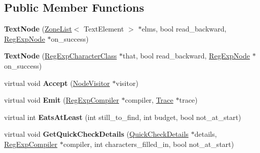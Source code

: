 \subsection*{Public Member Functions}
\begin{DoxyCompactItemize}
\item 
{\bfseries Text\+Node} (\hyperlink{classv8_1_1internal_1_1_zone_list}{Zone\+List}$<$ Text\+Element $>$ $\ast$elms, bool read\+\_\+backward, \hyperlink{classv8_1_1internal_1_1_reg_exp_node}{Reg\+Exp\+Node} $\ast$on\+\_\+success)\hypertarget{classv8_1_1internal_1_1_text_node_ad82f037bc18bc07fe99b03473cca0713}{}\label{classv8_1_1internal_1_1_text_node_ad82f037bc18bc07fe99b03473cca0713}

\item 
{\bfseries Text\+Node} (\hyperlink{classv8_1_1internal_1_1_reg_exp_character_class}{Reg\+Exp\+Character\+Class} $\ast$that, bool read\+\_\+backward, \hyperlink{classv8_1_1internal_1_1_reg_exp_node}{Reg\+Exp\+Node} $\ast$on\+\_\+success)\hypertarget{classv8_1_1internal_1_1_text_node_a37623d87d91c4df2206bd2e39705caf0}{}\label{classv8_1_1internal_1_1_text_node_a37623d87d91c4df2206bd2e39705caf0}

\item 
virtual void {\bfseries Accept} (\hyperlink{classv8_1_1internal_1_1_node_visitor}{Node\+Visitor} $\ast$visitor)\hypertarget{classv8_1_1internal_1_1_text_node_afc1b418856860bb73f833a3dd4655ff9}{}\label{classv8_1_1internal_1_1_text_node_afc1b418856860bb73f833a3dd4655ff9}

\item 
virtual void {\bfseries Emit} (\hyperlink{classv8_1_1internal_1_1_reg_exp_compiler}{Reg\+Exp\+Compiler} $\ast$compiler, \hyperlink{classv8_1_1internal_1_1_trace}{Trace} $\ast$trace)\hypertarget{classv8_1_1internal_1_1_text_node_ab866c5088ced3f06211220ed8c6fd081}{}\label{classv8_1_1internal_1_1_text_node_ab866c5088ced3f06211220ed8c6fd081}

\item 
virtual int {\bfseries Eats\+At\+Least} (int still\+\_\+to\+\_\+find, int budget, bool not\+\_\+at\+\_\+start)\hypertarget{classv8_1_1internal_1_1_text_node_a981ca890ad4e501bfbd9b301dc0e61b6}{}\label{classv8_1_1internal_1_1_text_node_a981ca890ad4e501bfbd9b301dc0e61b6}

\item 
virtual void {\bfseries Get\+Quick\+Check\+Details} (\hyperlink{classv8_1_1internal_1_1_quick_check_details}{Quick\+Check\+Details} $\ast$details, \hyperlink{classv8_1_1internal_1_1_reg_exp_compiler}{Reg\+Exp\+Compiler} $\ast$compiler, int characters\+\_\+filled\+\_\+in, bool not\+\_\+at\+\_\+start)\hypertarget{classv8_1_1internal_1_1_text_node_a8526e95c8f850c1ac1e690aa86fb1486}{}\label{classv8_1_1internal_1_1_text_node_a8526e95c8f850c1ac1e690aa86fb1486}


\end{DoxyCompactItemize}
